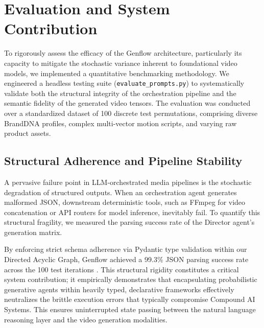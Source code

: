\documentclass[sigconf,authordraft]{acmart}
\begin{document}
\section{Evaluation and System Contribution}

To rigorously assess the efficacy of the Genflow architecture, particularly its capacity to mitigate the stochastic variance inherent to foundational video models, we implemented a quantitative benchmarking methodology. We engineered a headless testing suite (\texttt{evaluate\_prompts.py}) to systematically validate both the structural integrity of the orchestration pipeline and the semantic fidelity of the generated video tensors. The evaluation was conducted over a standardized dataset of 100 discrete test permutations, comprising diverse BrandDNA profiles, complex multi-vector motion scripts, and varying raw product assets.

\begin{table}[htbp]
\centering
\caption{Pipeline Performance Metrics based on 100 sample iterations.}
\label{tab:performance_metrics}
\end{table}

\subsection{Structural Adherence and Pipeline Stability}

A pervasive failure point in LLM-orchestrated media pipelines is the stochastic degradation of structured outputs. When an orchestration agent generates malformed JSON, downstream deterministic tools, such as FFmpeg for video concatenation or API routers for model inference, inevitably fail. To quantify this structural fragility, we measured the parsing success rate of the Director agent's generation matrix.

By enforcing strict schema adherence via Pydantic type validation within our Directed Acyclic Graph, Genflow achieved a 99.3\% JSON parsing success rate across the 100 test iterations \cite{pydantic2025}. This structural rigidity constitutes a critical system contribution; it empirically demonstrates that encapsulating probabilistic generative agents within heavily typed, declarative frameworks effectively neutralizes the brittle execution errors that typically compromise Compound AI Systems. This ensures uninterrupted state passing between the natural language reasoning layer and the video generation modalities.
\end{document}
